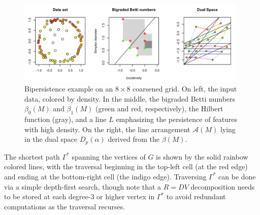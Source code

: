 \documentclass{siamart190516}
\begin{document}
\begin{figure}[t]
	\includegraphics[width=0.98\textwidth]{bifiltration_ex2}
	\caption{Bipersistence example on an $8 \times 8$ coarsened grid. On left, the input data, colored by density. In the middle, the bigraded Betti numbers $\beta_0(M)$ and $\beta_1(M)$ (green and red, respectively), the Hilbert function (gray), and a line $L$ emphasizing the persistence of features with high density. On the right, the line arrangement $\mathcal{A}(M)$ lying in the dual space $D_p(\alpha)$ derived from the $\beta(M)$. }
	\label{fig:bifiltration_ex2}
\end{figure}
The shortest path $\Gamma^\ast$ spanning the vertices of $G$ is shown by the solid rainbow colored lines, with the traversal beginning in the top-left cell (at the red edge) and ending at the bottom-right cell (the indigo edge). Traversing $\Gamma^\ast$ can be done via a simple depth-first search, though note that a $R=DV$ decomposition needs to be stored at each degree-3 or higher vertex in $\Gamma^\ast$ to avoid redundant computations as the traversal recurses. 
\\

\end{document}
